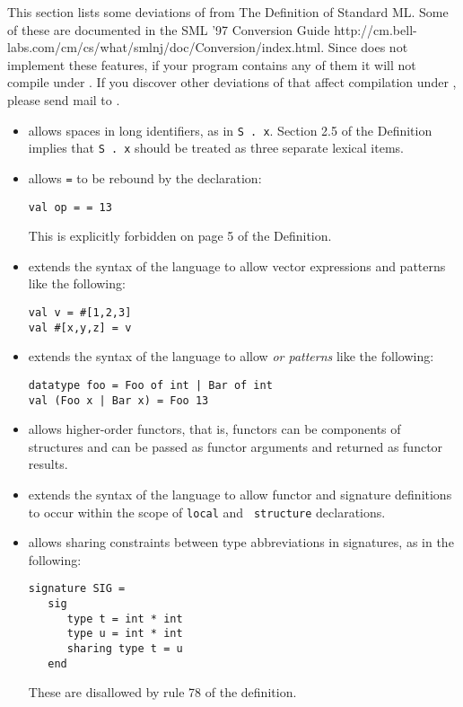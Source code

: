 
This section lists some deviations of {\smlnj} from The Definition of
Standard ML.  Some of these are documented in the 
\htmladdnormallink
  {SML '97 Conversion Guide}
  {http://cm.bell-labs.com/cm/cs/what/smlnj/doc/Conversion/index.html}.
Since {\mlton} does not implement these features, if your program
contains any of them it will not compile under {\mlton}.  If you discover
other deviations of {\smlnj} that affect compilation under {\mlton},
please send mail to {\mltonmail}.

\begin{itemize}
\item
{\smlnj} allows spaces in long identifiers, as in {\tt S . x}.
Section 2.5 of the Definition implies that {\tt S . x} should be
treated as three separate lexical items.

\item
{\smlnj} allows {\tt =} to be rebound by the declaration:
\begin{verbatim}
val op = = 13
\end{verbatim}
This is explicitly forbidden on page 5 of the Definition.

\item
{\smlnj} extends the syntax of the language to allow
vector expressions and patterns like the following:
\begin{verbatim}
val v = #[1,2,3]
val #[x,y,z] = v
\end{verbatim}

\item 
{\smlnj} extends the syntax of the language to allow {\em or patterns}
like the following:
\begin{verbatim}
datatype foo = Foo of int | Bar of int
val (Foo x | Bar x) = Foo 13
\end{verbatim}

\item
{\smlnj} allows higher-order functors, that is, functors can be
components of structures and can be passed as functor arguments and
returned as functor results. 

\item
{\smlnj} extends the syntax of the language to allow functor and
signature definitions to occur within the scope of {\tt local} and {\tt
structure} declarations.

\item
{\smlnj} allows sharing constraints between type abbreviations in
signatures, as in the following:
\begin{verbatim}
signature SIG =
   sig
      type t = int * int
      type u = int * int
      sharing type t = u
   end
\end{verbatim}
These are disallowed by rule 78 of the definition.


\end{itemize}

